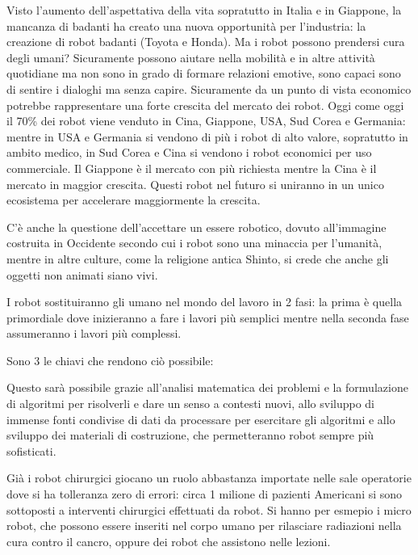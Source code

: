 \documentclass[a4page, 11pt]{article}
\begin{document}
Visto l'aumento dell'aspettativa della vita sopratutto in Italia e in Giappone, la mancanza di badanti ha creato una nuova opportunità per l'industria: la creazione di robot badanti (Toyota e Honda).
Ma i robot possono prendersi cura degli umani?
Sicuramente possono aiutare nella mobilità e in altre attività quotidiane ma non sono in grado di formare relazioni emotive, sono capaci sono di sentire i dialoghi ma senza capire.
Sicuramente da un punto di vista economico potrebbe rappresentare una forte crescita del mercato dei robot.
Oggi come oggi il 70\% dei robot viene venduto in Cina, Giappone, USA, Sud Corea e Germania: mentre in USA e Germania si vendono di più i robot di alto valore, sopratutto in ambito medico, in Sud Corea e Cina si vendono i robot economici per uso commerciale.
Il Giappone è il mercato con più richiesta mentre la Cina è il mercato in maggior crescita.
Questi robot nel futuro si uniranno in un unico ecosistema per accelerare maggiormente la crescita.

C'è anche la questione dell'accettare un essere robotico, dovuto all'immagine costruita in Occidente secondo cui i robot sono una minaccia per l'umanità, mentre in altre culture, come la religione antica Shinto, si crede che anche gli oggetti non animati siano vivi.

I robot sostituiranno gli umano nel mondo del lavoro in 2 fasi: la prima è quella primordiale dove inizieranno a fare i lavori più semplici mentre nella seconda fase assumeranno i lavori più complessi.

Sono 3 le chiavi che rendono ciò possibile:

Questo sarà possibile grazie all'analisi matematica dei problemi e la formulazione di algoritmi per risolverli e dare un senso a contesti nuovi, allo sviluppo di immense fonti condivise di dati da processare per esercitare gli algoritmi e allo sviluppo dei materiali di costruzione, che permetteranno robot sempre più sofisticati.

Già i robot chirurgici giocano un ruolo abbastanza importate nelle sale operatorie dove si ha tolleranza zero di errori: circa 1 milione di pazienti Americani si sono sottoposti a interventi chirurgici effettuati da robot.
Si hanno per esmepio i micro robot, che possono essere inseriti nel corpo umano per rilasciare radiazioni nella cura contro il cancro, oppure dei robot che assistono nelle lezioni.
\end{document}
